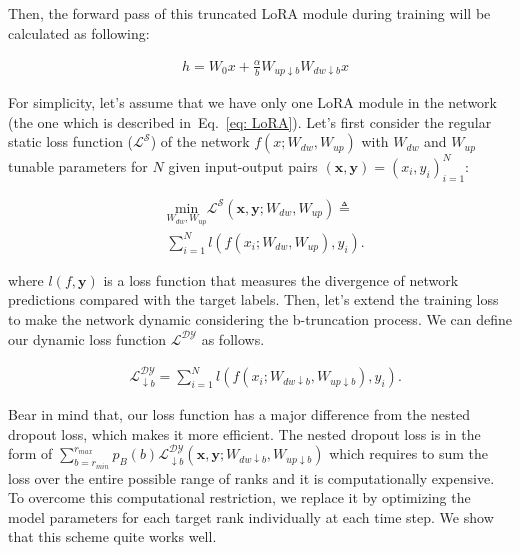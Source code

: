 Then, the forward pass of this truncated LoRA module during training will be calculated as following:

\begin{equation}
\begin{split}
  & h = W_0x+ \frac{\alpha}{b} W_{up \downarrow b} W_{dw \downarrow b} x 
\end{split}
\label{eq: LoRA}
\end{equation}

For simplicity, let's assume that we have only one LoRA module in the network (the one which is described in~Eq.~\ref{eq: LoRA}). Let's first consider the regular static loss function ($\mathcal{L^S}$) of the network $f(x;W_{dw},W_{up})$ with $W_{dw}$ and $W_{up}$ tunable parameters for $N$ given input-output pairs  $(\textbf{x},\textbf{y}) = (x_i,y_i)_{i=1}^N$:

\begin{equation}
\begin{split}
  &  \underset{W_{dw}, W_{up}}{\text{min}} \mathcal{L^S} (\textbf{x},\textbf{y};W_{dw},W_{up}) \triangleq \\ 
  &  \sum_{i=1}^N l (f(x_i;W_{dw},W_{up}),y_i). 
\end{split}
\end{equation}

where $l(f,\textbf{y})$ is a loss function that measures the divergence of network predictions compared with the target labels. Then, let's extend the training loss to make the network dynamic considering the b-truncation process. We can define our dynamic loss function $\mathcal{L^{DY}}$ as follows.

\begin{equation}\label{eq:lossFunction}
\begin{split}
  &  \mathcal{L}_{\downarrow b}^{\mathcal{DY}} = \sum_{i=1}^N l (f(x_i;W_{dw \downarrow b},W_{up \downarrow b}),y_i). 
\end{split}
\end{equation}

Bear in mind that, our loss function has a major difference from the nested dropout loss, which makes it more efficient. The nested dropout loss is in the form of $\sum_{b=r_{min}}^{r_{max}} p_B(b) \mathcal{L}_{\downarrow b}^{\mathcal{DY}} (\textbf{x},\textbf{y};W_{dw\downarrow b},W_{up\downarrow b}) $ which requires to sum the loss over the entire possible range of ranks and it is computationally expensive. To overcome this computational restriction, we replace it by optimizing the model parameters for each target rank individually at each time step. We show that this scheme quite works well. 


